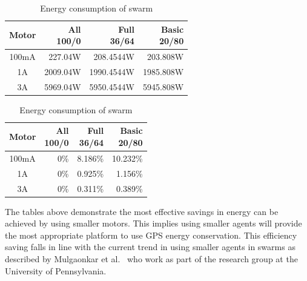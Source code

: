 \documentclass{ieeeaccess}
\begin{document}
\begin{table}
\begin{center}
\begin{tabular}{| c | r | r | r |}
\hline
{\parbox{1.5cm}{\centering Motor}} & {\parbox{1cm}{\centering All\\100/0}} & {\parbox{1.5cm}{\centering Full\\36/64}} & {\parbox{1.5cm}{\centering Basic \\20/80}} \\ \hline
100mA &  227.04W &  208.4544W &  203.808W\\ \hline
1A    & 2009.04W & 1990.4544W & 1985.808W\\ \hline
3A    & 5969.04W & 5950.4544W & 5945.808W\\ \hline
\end{tabular}\caption{Energy consumption of swarm} \label{tab:Energy2}
\end{center}
\end{table}

\begin{table}
\begin{center}
\begin{tabular}{| c | r | r | r |}
\hline
{\parbox{1.5cm}{\centering Motor}} & {\parbox{1cm}{\centering All\\100/0}} & {\parbox{1,5cm}{\centering Full\\36/64}} & {\parbox{1.5cm}{\centering Basic \\20/80}} \\ \hline
100mA & 0\% & 8.186\% & 10.232\% \\ \hline
1A    & 0\% & 0.925\% &  1.156\% \\ \hline
3A    & 0\% & 0.311\% &  0.389\% \\ \hline
\end{tabular}\caption{Energy consumption of swarm} \label{tab:Energy3}
\end{center}
\end{table}

The tables above demonstrate the most effective savings in energy can be achieved by using smaller motors. This implies using smaller agents will provide the most appropriate platform to use GPS energy conservation. This efficiency saving falls in line with the current trend in using smaller agents in swarms as described by Mulgaonkar et al.~\cite{KV:16,MCK:15} who work as part of the research group at the University of Pennsylvania.
\end{document}
